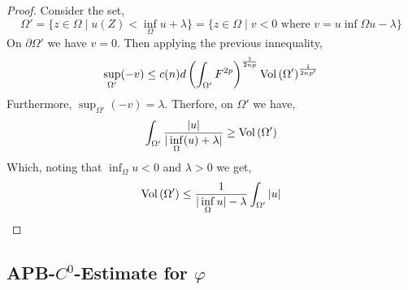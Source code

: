 \documentclass[12pt]{extarticle}
\theoremstyle{definition}
\begin{document}
\begin{proof}
Consider the set,
\[ \Omega' = \{ z \in \Omega \mid u(Z) < \inf_{\Omega} u + \lambda \} = \{ z \in \Omega \mid v < 0 \text{ where } v = u  \inf\limits{\Omega} u - \lambda \} \]
On $\partial \Omega'$ we have $v = 0$. Then applying the previous innequality,
\[ \sup\limits_{\Omega'}(-v) \le c(n) d \left( \int_{\Omega'} F^{2 p} \right)^{\frac{1}{2 n p}} \mathrm{Vol}\left(\Omega'\right)^{\frac{1}{2np'}} \]
Furthermore, $\sup_{\Omega'}(-v) = \lambda$. Therfore, on $\Omega'$ we have,
\[ \int_{\Omega'} \frac{|u|}{|\inf\limits_{\Omega}(u) + \lambda|} \ge \mathrm{Vol}\left(\Omega'\right) \]
Which, noting that $\inf_{\Omega} u < 0$ and $\lambda > 0$ we get,
\[ \mathrm{Vol}\left(\Omega'\right) \le \frac{1}{|\inf\limits_{\Omega} u | - \lambda} \int_{\Omega'} |u| \]
\end{proof}

\subsection{APB-$C^0$-Estimate for $\varphi$}
\end{document}
